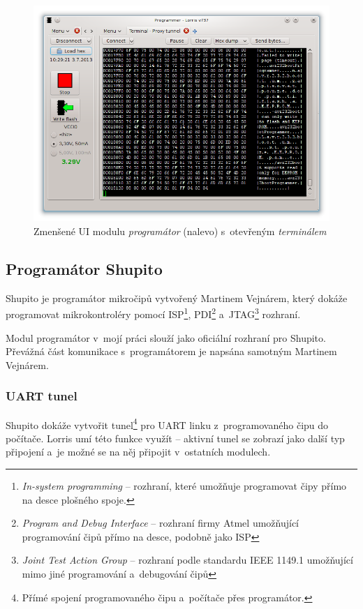 \documentclass[12pt, a4paper, oneside]{article}
\newcommand{\It}{\textit}  %
\begin{document}
\begin{figure}[H]
\begin{center}
\includegraphics[width=\textwidth]{img/programmer_mini.png}
\caption{Zmenšené UI modulu \It{programátor} (nalevo) s~otevřeným \It{terminálem}}
\label{prog_mini}
\end{center}
\end{figure}

\subsection{Programátor Shupito}
Shupito je programátor mikročipů vytvořený Martinem Vejnárem, který dokáže programovat mikrokontroléry pomocí ISP\footnote{\It{In-system programming} -- rozhraní, které umožňuje programovat čipy přímo na desce plošného spoje.}, PDI\footnote{\It{Program and Debug Interface} -- rozhraní firmy Atmel umožňující programování čipů přímo na desce, podobně jako ISP} a~JTAG\footnote{\It{Joint Test Action Group} -- rozhraní podle standardu IEEE 1149.1 umožňující mimo jiné programování a~debugování čipů} rozhraní. 

Modul programátor v~mojí práci slouží jako oficiální rozhraní pro Shupito. Převážná část komunikace s~programátorem je napsána samotným Martinem Vejnárem.

\subsubsection{UART tunel}
\label{tunel}
Shupito dokáže vytvořit tunel\footnote{Přímé spojení programovaného čipu a~počítače přes programátor.} pro UART linku z~programovaného čipu do počítače. Lorris umí této funkce využít -- aktivní tunel se zobrazí jako další typ připojení a~je možné se na něj připojit v~ostatních modulech.
\end{document}
